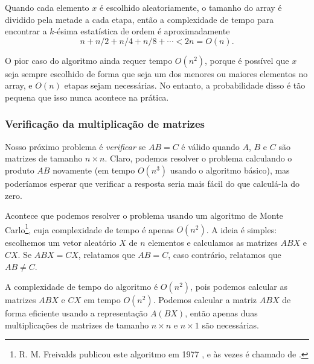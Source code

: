 Quando cada elemento $x$ é escolhido aleatoriamente,
o tamanho do array é dividido pela metade a cada etapa,
então a complexidade de tempo para
encontrar a $k$-ésima estatística de ordem é aproximadamente
\[n+n/2+n/4+n/8+\cdots < 2n = O(n).\]

O pior caso do algoritmo ainda requer tempo $O(n^2)$,
porque é possível que $x$ seja sempre escolhido
de forma que seja um dos menores ou maiores
elementos no array, e $O(n)$ etapas sejam necessárias.
No entanto, a probabilidade disso é tão pequena
que isso nunca acontece na prática.

\subsubsection{Verificação da multiplicação de matrizes}


Nosso próximo problema é \emph{verificar}
se $AB=C$ é válido quando $A$, $B$ e $C$
são matrizes de tamanho $n \times n$.
Claro, podemos resolver o problema
calculando o produto $AB$ novamente
(em tempo $O(n^3)$ usando o algoritmo básico),
mas poderíamos esperar que verificar a
resposta seria mais fácil do que calculá-la do zero.

Acontece que podemos resolver o problema
usando um algoritmo de Monte Carlo\footnote{R. M. Freivalds publicou
este algoritmo em 1977 \cite{fre77}, e às vezes é chamado
de  .}, cuja
complexidade de tempo é apenas $O(n^2)$.
A ideia é simples: escolhemos um vetor aleatório
$X$ de $n$ elementos e calculamos as matrizes
$ABX$ e $CX$. Se $ABX=CX$, relatamos que $AB=C$,
caso contrário, relatamos que $AB \neq C$.

A complexidade de tempo do algoritmo é
$O(n^2)$, pois podemos calcular as matrizes
$ABX$ e $CX$ em tempo $O(n^2)$.
Podemos calcular a matriz $ABX$ de forma eficiente
usando a representação $A(BX)$, então apenas duas
multiplicações de matrizes de tamanho $n \times n$ e $n \times 1$
são necessárias.

